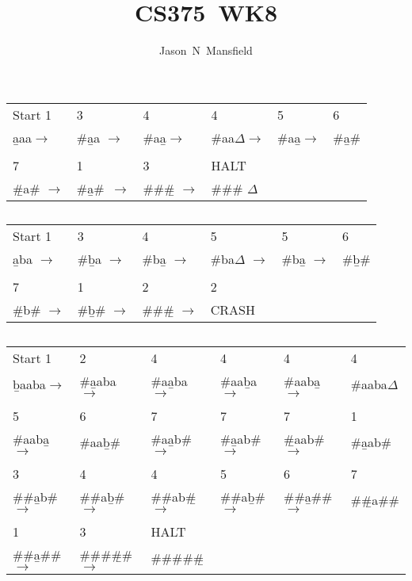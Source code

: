 \documentclass[10pt]{report}
\title{CS375~WK8}
\author{Jason~N~Mansfield}
\begin{document}
\section{}
\subsection{}

\begin{tabular}{ l l l l l l }  
  Start 1&3&4&4&5&6           \\         
\b{a}aa$\rightarrow$ & \#\b{a}a $\rightarrow$&\#a\b{a}$\rightarrow$ & \#aa\b{$\Delta$}$\rightarrow$& \#a\b{a}$\rightarrow$&\#\b{a}\#\\
&&&&&\\%
7&1&3&HALT&&\\
\b{\#}a\# $\rightarrow$&\#\b{a}\#\ $\rightarrow$&\#\#\b{\#} $\rightarrow$ & \#\#\# \b{$\Delta$} &&\\
\end{tabular}

\subsection{}
\begin{tabular}{l l l l l l}
Start 1& 3 & 4 & 5 & 5 & 6\\
\b{a}ba $\rightarrow$& \#\b{b}a $\rightarrow$& \#b\b{a} $\rightarrow$ & \#ba\b{$\Delta$} $\rightarrow$ & \#b\b{a} $\rightarrow$& \#\b{b}\# \\
&&&&&\\
7&1& 2 &2&&\\
\b{\#}b\# $\rightarrow$& \#\b{b}\# $\rightarrow$& \#\#\b{\#} $\rightarrow$&CRASH&&
\end{tabular}

\subsection{}
\begin{tabular}{l l l l l l}
Start 1& 2& 4& 4& 4&4\\
\b{b}aaba$\rightarrow$ & \#\b{a}aba $\rightarrow$& \#a\b{a}ba $\rightarrow$& \#aa\b{b}a $\rightarrow$ & \#aab\b{a} $\rightarrow$ & \#aaba\b{$\Delta$}\\
&&&&&\\%
5& 6 & 7& 7& 7& 1\\
\#aab\b{a}$\rightarrow$&\#aa\b{b}\# & \#a\b{a}b\# $\rightarrow$ & \#\b{a}ab\# $\rightarrow$ & \b{\#}aab\# $\rightarrow$& \#\b{a}ab\# \\
&&&&&\\%
3&4&4&5& 6& 7\\
\#\#\b{a}b\# $\rightarrow$ & \#\#a\b{b}\# $\rightarrow$ & \#\#ab\b{\#} $\rightarrow$ & \#\#a\b{b}\# $\rightarrow$ & \#\#\b{a}\#\# $\rightarrow$ & \#\b{\#}a\#\#\\
&&&&&\\%
1& 3 & HALT &&&\\
\#\#\b{a}\#\# $\rightarrow$ & \#\#\#\b{#}\# $\rightarrow$ & \#\#\#\#\b{\#} &&&\\
\end{tabular}
\end{document}
